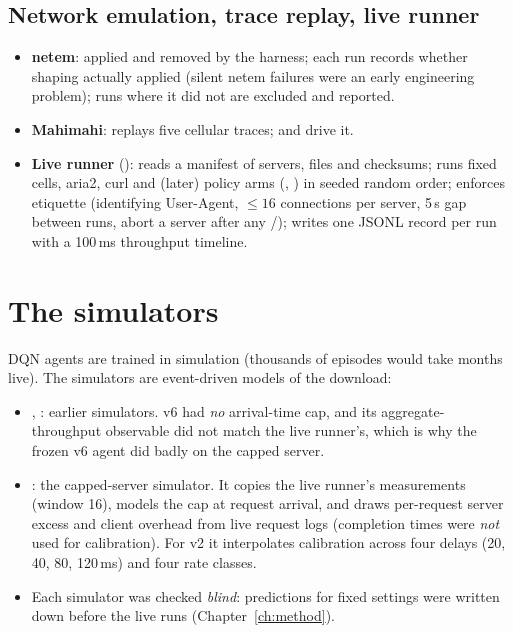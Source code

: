 \subsection{Network emulation, trace replay, live runner}
\begin{itemize}
\item \textbf{netem}: applied and removed by the harness; each run records whether shaping actually applied (silent netem failures were an early engineering problem); runs where it did not are excluded and reported.
\item \textbf{Mahimahi}:  replays five cellular traces;  and  drive it.
\item \textbf{Live runner} (): reads a manifest of servers, files and checksums; runs fixed cells, aria2, curl and (later) policy arms (, ) in seeded random order; enforces etiquette (identifying User-Agent, $\le 16$ connections per server, 5\,s gap between runs, abort a server after any /); writes one JSONL record per run with a 100\,ms throughput timeline.
\end{itemize}

\section{The simulators}
DQN agents are trained in simulation (thousands of episodes would take months live). The simulators are event-driven models of the download:
\begin{itemize}
\item {}, : earlier simulators. v6 had \emph{no} arrival-time cap, and its aggregate-throughput observable did not match the live runner's, which is why the frozen v6 agent did badly on the capped server.
\item {}: the capped-server simulator. It copies the live runner's measurements (window 16), models the cap at request arrival, and draws per-request server excess and client overhead from live request logs (completion times were \emph{not} used for calibration). For v2 it interpolates calibration across four delays (20, 40, 80, 120\,ms) and four rate classes.
\item Each simulator was checked \emph{blind}: predictions for fixed settings were written down before the live runs (Chapter~\ref{ch:method}).
\end{itemize}

